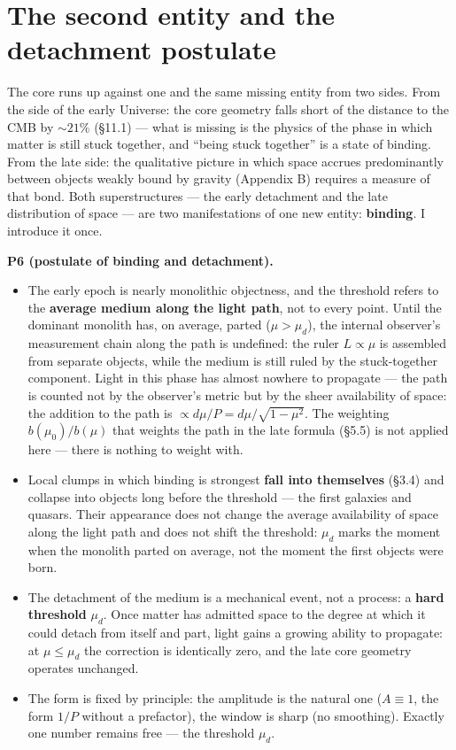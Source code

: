 \documentclass{article}
\begin{document}
\section{The second entity and the detachment postulate}

The core runs up against one and the same missing entity from two sides. From the side of the early Universe: the core geometry falls short of the distance to the CMB by ${\sim}21\%$ (\S11.1) --- what is missing is the physics of the phase in which matter is still stuck together, and ``being stuck together'' is a state of binding. From the late side: the qualitative picture in which space accrues predominantly between objects weakly bound by gravity (Appendix B) requires a measure of that bond. Both superstructures --- the early detachment and the late distribution of space --- are two manifestations of one new entity: \textbf{binding}. I introduce it once.

\medskip
\noindent\textbf{P6 (postulate of binding and detachment).}
\begin{itemize}
  \item The early epoch is nearly monolithic objectness, and the threshold refers to the \textbf{average medium along the light path}, not to every point. Until the dominant monolith has, on average, parted ($\mu > \mu_d$), the internal observer's measurement chain along the path is undefined: the ruler $L \propto \mu$ is assembled from separate objects, while the medium is still ruled by the stuck-together component. Light in this phase has almost nowhere to propagate --- the path is counted not by the observer's metric but by the sheer availability of space: the addition to the path is $\propto d\mu/P = d\mu/\sqrt{1-\mu^2}$. The weighting $b(\mu_0)/b(\mu)$ that weights the path in the late formula (\S5.5) is not applied here --- there is nothing to weight with.
  \item Local clumps in which binding is strongest \textbf{fall into themselves} (\S3.4) and collapse into objects long before the threshold --- the first galaxies and quasars. Their appearance does not change the average availability of space along the light path and does not shift the threshold: $\mu_d$ marks the moment when the monolith parted on average, not the moment the first objects were born.
  \item The detachment of the medium is a mechanical event, not a process: a \textbf{hard threshold} $\mu_d$. Once matter has admitted space to the degree at which it could detach from itself and part, light gains a growing ability to propagate: at $\mu \le \mu_d$ the correction is identically zero, and the late core geometry operates unchanged.
  \item The form is fixed by principle: the amplitude is the natural one ($A \equiv 1$, the form $1/P$ without a prefactor), the window is sharp (no smoothing). Exactly one number remains free --- the threshold $\mu_d$.
\end{itemize}
\end{document}
